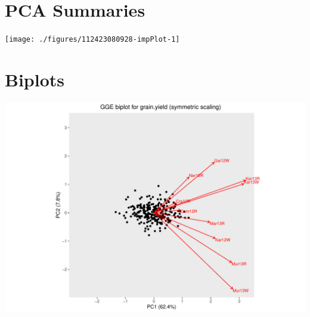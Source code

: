 \documentclass[a4paper,11pt]{article}\usepackage[]{graphicx}\usepackage[]{xcolor}
\makeatletter
\def\maxwidth{ %
  \ifdim\Gin@nat@width>\linewidth
    \linewidth
  \else
    \Gin@nat@width
  \fi
}
\newenvironment{kframe}{%
 \def\at@end@of@kframe{}%
 \ifinner\ifhmode%
  \def\at@end@of@kframe{\end{minipage}}%
  \begin{minipage}{\columnwidth}%
 \fi\fi%
 \def\FrameCommand##1{\hskip\@totalleftmargin \hskip-\fboxsep
 \colorbox{shadecolor}{##1}\hskip-\fboxsep
     \hskip-\linewidth \hskip-\@totalleftmargin \hskip\columnwidth}%
 \MakeFramed {\advance\hsize-\width
   \@totalleftmargin\z@ \linewidth\hsize
   \@setminipage}}%
 {\par\unskip\endMakeFramed%
 \at@end@of@kframe}
\newenvironment{knitrout}{}{} %
\makeatother
\begin{document}
\clearpage
\section{PCA Summaries}

\begin{table}[ht]
\begin{flushleft}
\label{importance}
\end{flushleft}
\end{table}


\begin{knitrout}
\color{fgcolor}\begin{kframe}
\end{kframe}

\texttt{[image: ./figures/112423080928-impPlot-1]} \hfill{}


\end{knitrout}
\newpage

\section{Biplots}
\begin{knitrout}
\color{fgcolor}\begin{kframe}
\end{kframe}
\includegraphics[width=0.9\maxwidth]{./figures/112423080928-biplot-1} 
\end{knitrout}

\end{document}

